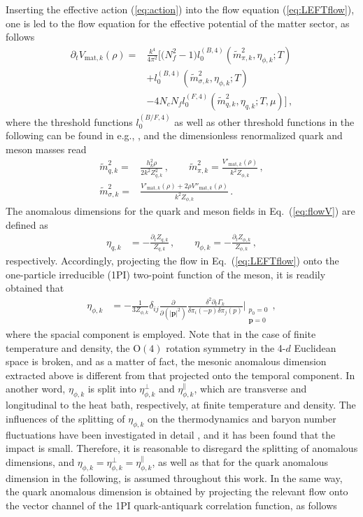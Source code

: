 \documentclass[%
reprint,
superscriptaddress,
showpacs,preprintnumbers,
amsmath,amssymb,
aps,
prd,
]{revtex4-1}
\def\Eq#1{Eq.~(\ref{#1})}
\def\eq#1{(\ref{#1})}
\begin{document}
Inserting the effective action \eq{eq:action} into the flow equation \eq{eq:LEFTflow}, one is led to the flow equation for the effective potential of the matter sector, as follows
%
\begin{align}
\partial_t V_{\mathrm{mat},k}(\rho)=&\frac{k^4}{4\pi^2} \bigg [\big(N^2_f-1\big) l^{(B,4)}_{0}(\tilde{m}^{2}_{\pi,k},\eta_{\phi,k};T)\nonumber\\[2ex]
&+l^{(B,4)}_{0}(\tilde{m}^{2}_{\sigma,k},\eta_{\phi,k};T)\nonumber\\[2ex]
&-4N_c N_f l^{(F,4)}_{0}(\tilde{m}^{2}_{q,k},\eta_{q,k};T,\mu)\bigg]\,, \label{eq:flowV}
\end{align}
%
where the threshold functions $l^{(B/F,4)}_{0}$ as well as other threshold functions in the following can be found in e.g., \cite{Fu:2019hdw,Yin:2019ebz}, and the dimensionless renormalized quark and meson masses read
%
\begin{align}
\tilde{m}^{2}_{q,k}=&\frac{h^{2}_{k}\rho}{2k^2Z^{2}_{q,k}}\,, \qquad \tilde{m}^{2}_{\pi,k}=\frac{V'_{\mathrm{mat},k}(\rho)}{k^2 Z_{\phi,k}}\,, \\[2ex]
\tilde{m}^{2}_{\sigma,k}=&\frac{V'_{\mathrm{mat},k}(\rho)+2\rho V''_{\mathrm{mat},k}(\rho)}{k^2 Z_{\phi,k}}\,.\label{}
\end{align}
%
The anomalous dimensions for the quark and meson fields in \Eq{eq:flowV} are defined as
%
\begin{align}
\eta_{q,k}&=-\frac{\partial_t Z_{q,k}}{Z_{q,k}}\,,\qquad
\eta_{\phi,k}=-\frac{\partial_t Z_{\phi,k}}{Z_{\phi,k}}\,,
\end{align}
%
respectively. Accordingly, projecting the flow in \Eq{eq:LEFTflow} onto the one-particle irreducible (1PI) two-point function of the meson, it is readily obtained that 
%
\begin{align}
\eta_{\phi,k}&=-\frac{1}{3Z_{\phi,k}}\delta_{ij}\frac{\partial}{\partial (|\bm{p}|^2)}\frac{\delta^2 \partial_t \Gamma_k}{\delta \pi_i(-p) \delta \pi_j(p)}\Bigg|_{\substack{p_0=0\\ \bm{p}=0}}\,,\label{eq:etaphi}
\end{align}
%
where the spacial component is employed. Note that in the case of finite temperature and density, the $\mathrm{O}(4)$ rotation symmetry in the 4-$d$ Euclidean space is broken, and as a matter of fact, the mesonic anomalous dimension extracted above is different from that projected onto the temporal component. In another word, $\eta_{\phi,k}$ is split into $\eta_{\phi,k}^{\perp}$ and $\eta_{\phi,k}^{\parallel}$, which are transverse and longitudinal to the heat bath, respectively, at finite temperature and density. The influences of the splitting of $\eta_{\phi,k}$ on the thermodynamics and baryon number fluctuations have been investigated in detail \cite{Yin:2019ebz}, and it has been found that the impact is small. Therefore, it is reasonable to disregard the splitting of anomalous dimensions, and $\eta_{\phi,k}=\eta_{\phi,k}^{\perp}=\eta_{\phi,k}^{\parallel}$, as well as that for the quark anomalous dimension in the following, is assumed throughout this work. In the same way, the quark anomalous dimension is obtained by projecting the relevant flow onto the vector channel of the 1PI quark-antiquark correlation function, as follows
\end{document}
